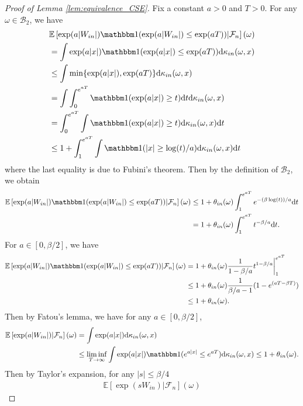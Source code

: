 \documentclass[12pt]{article}
\theoremstyle{definition}
\newcommand{\E}{\mathbb E}								%
\newcommand{\indicator}{\mathbbm 1}						%
\begin{document}
\begin{proof}[Proof of Lemma \ref{lem:equivalence_CSE}]
	Fix a constant $a>0$ and $T>0$. For any $\omega\in \mathcal{B}_2$, we have 
	\begin{align*}
		&
		\E\left[\exp(a|W_{in}|)\indicator(\exp(a|W_{in}|)\leq \exp(aT))|\mathcal{F}_n\right](\omega)\\
		&
		=\int \exp(a|x|)\indicator(\exp(a|x|)\leq \exp(aT))\mathrm{d}\kappa_{in}(\omega,x)\\
		&
		\leq \int \min \{\exp(a|x|),\exp(aT)\}\mathrm{d}\kappa_{in}(\omega,x)\\
		&
		=\int \int_0^{e^{aT}}\indicator(\exp(a|x|)\geq t)\mathrm{d}t\mathrm{d}\kappa_{in}(\omega,x)\\
		&
		=\int_0^{e^{aT}}\int \indicator(\exp(a|x|)\geq t)\mathrm{d}\kappa_{in}(\omega,x)\mathrm{d}t\\
		&
		\leq 1+ \int_1^{e^{aT}}\int \indicator(|x|\geq \log(t)/a)\mathrm{d}\kappa_{in}(\omega,x)\mathrm{d}t
	\end{align*}
	where the last equality is due to Fubini's theorem. Then by the definition of $\mathcal{B}_2$, we obtain 
	\begin{align*}
		\E\left[\exp(a|W_{in}|)\indicator(\exp(a|W_{in}|)\leq \exp(aT))|\mathcal{F}_n\right](\omega)
		&
		\leq 1+\theta_{in}(\omega)\int_1^{e^{aT}}e^{-(\beta\log(t))/a}\mathrm{d}t\\
		&
		=1+\theta_{in}(\omega)\int_{1}^{e^{aT}}t^{-\beta/a}\mathrm{d}t.
	\end{align*}
	For $a\in [0,\beta/2]$, we have 
	\begin{align*}
		\E\left[\exp(a|W_{in}|)\indicator(\exp(a|W_{in}|)\leq \exp(aT))|\mathcal{F}_n\right](\omega)
		&
		=1+\theta_{in}(\omega)\frac{1}{1-\beta/a}t^{1-\beta/a}\bigg|_{1}^{e^{aT}}\\
		&
		\leq 1+\theta_{in}(\omega)\frac{1}{\beta/a - 1}(1-e^{(aT-\beta T)})\\
		&
		\leq 1+\theta_{in}(\omega).
	\end{align*}
	Then by Fatou's lemma, we have for any $a\in [0,\beta/2]$,
	\begin{align}
		\E\left[\exp(a|W_{in}|)|\mathcal{F}_n\right](\omega)
		&\nonumber
		=\int \exp(a|x|)\mathrm{d}\kappa_{in}(\omega,x)\\
		&\label{eq:upper_bound_cgf}
		\leq \liminf_{T\rightarrow\infty}\int \exp(a|x|)\indicator(e^{a|x|}\leq e^{aT})\mathrm{d}\kappa_{in}(\omega,x)\leq 1+\theta_{in}(\omega).
	\end{align}
	Then by Taylor's expansion, for any $|s|\leq \beta/4$
	\begin{align*}
		\E[\exp(sW_{in})|\mathcal{F}_n](\omega)

\end{align*}
\end{proof}
\end{document}
